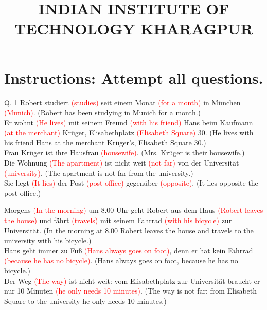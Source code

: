 \documentclass{article}
\title{
INDIAN INSTITUTE OF TECHNOLOGY KHARAGPUR
}
\date{}
\begin{document}
\maketitle

\section*{Instructions: Attempt all questions.}
Q. 1 Robert studiert \textcolor{red}{(studies)} seit einem Monat \textcolor{red}{(for a month)} in München \textcolor{red}{(Munich)}. (Robert has been studying in Munich for a month.)\\
Er wohnt \textcolor{red}{(He lives)} mit seinem Freund \textcolor{red}{(with his friend)} Hans beim Kaufmann \textcolor{red}{(at the merchant)} Krüger, Elisabethplatz \textcolor{red}{(Elisabeth Square)} 30. (He lives with his friend Hans at the merchant Krüger's, Elisabeth Square 30.)\\
Frau Krüger ist ihre Hausfrau \textcolor{red}{(housewife)}. (Mrs. Krüger is their housewife.)\\
Die Wohnung \textcolor{red}{(The apartment)} ist nicht weit \textcolor{red}{(not far)} von der Universität \textcolor{red}{(university)}. (The apartment is not far from the university.)\\
Sie liegt \textcolor{red}{(It lies)} der Post \textcolor{red}{(post office)} gegenüber \textcolor{red}{(opposite)}. (It lies opposite the post office.)

Morgens \textcolor{red}{(In the morning)} um 8.00 Uhr geht Robert aus dem Haus \textcolor{red}{(Robert leaves the house)} und fährt \textcolor{red}{(travels)} mit seinem Fahrrad \textcolor{red}{(with his bicycle)} zur Universität. (In the morning at 8.00 Robert leaves the house and travels to the university with his bicycle.)\\
Hans geht immer zu Fuß \textcolor{red}{(Hans always goes on foot)}, denn er hat kein Fahrrad \textcolor{red}{(because he has no bicycle)}. (Hans always goes on foot, because he has no bicycle.)\\
Der Weg \textcolor{red}{(The way)} ist nicht weit: vom Elisabethplatz zur Universität braucht er nur 10 Minuten \textcolor{red}{(he only needs 10 minutes)}. (The way is not far: from Elisabeth Square to the university he only needs 10 minutes.)
\end{document}

